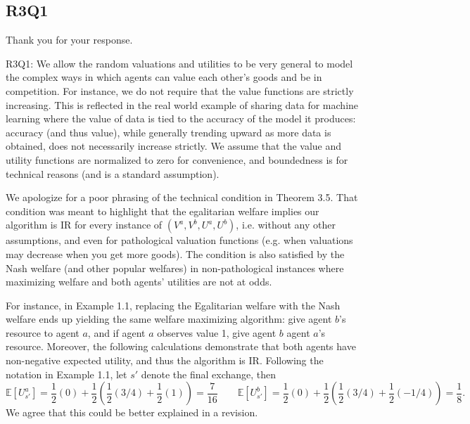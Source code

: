 \documentclass[11pt]{extarticle}
\newcommand{\comment}[1]{\textcolor{red}{(#1)}}
\begin{document}

\subsection*{R3Q1}

Thank you for your response.

\vspace{0.2cm}
\noindent 
R3Q1: We allow the random valuations and utilities to be very general to model the complex ways 
in which agents can value each other's goods and be in competition. For instance, 
we do not require that the value functions are strictly increasing. This is reflected in the real
world example of sharing data for machine learning where the value of data is 
tied to the accuracy of the model it produces: accuracy (and thus value), while generally trending 
upward as more data is obtained, does 
not necessarily increase strictly.
We assume that the value and utility functions are normalized to zero for convenience,
and boundedness is for technical reasons (and is a standard assumption).



\vspace{0.2cm}
\noindent 
We apologize for a poor phrasing of the technical condition in Theorem 3.5.
That condition was meant to
highlight
that the egalitarian welfare 
implies our algorithm is IR
for every instance
of $(V^a,V^b,U^a,U^b)$, i.e. without any other assumptions, and even for pathological valuation functions (e.g. when valuations may decrease when you get more goods).
The condition is also satisfied by the Nash welfare (and other popular welfares) in
non-pathological instances where maximizing welfare and both agents' utilities are not at odds. 


For instance, in
Example 1.1, replacing the Egalitarian welfare with the Nash welfare ends up yielding the same 
welfare maximizing algorithm: give agent $b$'s resource to agent $a$, and if agent $a$
observes value 1, give agent $b$ agent $a$'s resource. 
Moreover, the following calculations demonstrate that both agents have non-negative expected utility,
and thus the algorithm is IR. Following the notation in Example 1.1, let $s'$ denote the 
final exchange, then
\[
    \mathbb{E}\left[
        U^a_{s'}
    \right]
    =
    \frac{1}{2}(0)
    +
    \frac{1}{2}
    \left(
        \frac{1}{2}(3/4)
        +
        \frac{1}{2}(1)
    \right)
    =
    \frac{7}{16}
    \qquad
    \mathbb{E}\left[
        U^b_{s'}
    \right]
    =
    \frac{1}{2}(0)
    +
    \frac{1}{2}
    \left(
        \frac{1}{2}(3/4)
        +
        \frac{1}{2}(-1/4)
    \right)
    =
    \frac{1}{8} .
\]
We agree that this could be better explained in a revision.
\end{document}
